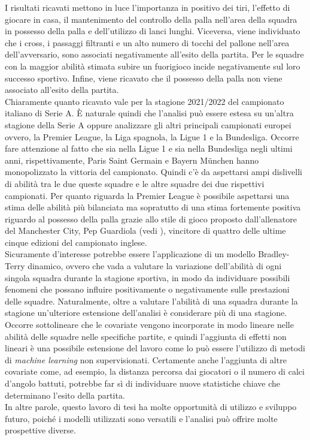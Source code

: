 I risultati ricavati mettono in luce l'importanza in positivo dei tiri, l'effetto di giocare in casa, il mantenimento del controllo della palla nell'area della squadra in possesso della palla e dell'utilizzo di lanci lunghi. Viceversa, viene individuato che i cross, i passaggi filtranti e un alto numero di tocchi del pallone nell'area dell’avversario, sono associati negativamente all'esito della partita. Per le squadre con la maggior abilità stimata subire un fuorigioco incide negativamente sul loro successo sportivo. Infine, viene ricavato che il possesso della palla non viene associato all'esito della partita.\\
Chiaramente quanto ricavato vale per la stagione 2021/2022 del campionato italiano di Serie A. È naturale quindi che l'analisi può essere estesa su un’altra stagione della Serie A oppure analizzare gli altri principali campionati europei ovvero, la Premier League, la Liga spagnola, la Ligue 1 e la Bundesliga. Occorre fare attenzione al fatto che sia nella Ligue 1 e sia nella Bundesliga negli ultimi anni, rispettivamente, Paris Saint Germain e Bayern München hanno monopolizzato la vittoria del campionato. Quindi c'è da aspettarsi ampi dislivelli di abilità tra le due queste squadre e le altre squadre dei due rispettivi campionati. Per quanto riguarda la Premier League è possibile aspettarsi una stima delle abilità più bilanciata ma sopratutto di una stima fortemente positiva riguardo al possesso della palla grazie allo stile di gioco proposto dall'allenatore del Manchester City, Pep Guardiola (vedi \textit{\cite{futbol}}), vincitore di quattro delle ultime cinque edizioni del campionato inglese.\\
Sicuramente d'interesse potrebbe essere l'applicazione di un modello Bradley-Terry dinamico, ovvero che vada a valutare la variazione dell'abilità di ogni singola squadra durante la stagione sportiva, in modo da individuare possibili fenomeni che possano influire positivamente o negativamente sulle prestazioni delle squadre. Naturalmente, oltre a valutare l'abilità di una squadra durante la stagione un'ulteriore estensione dell'analisi è considerare più di una stagione. Occorre sottolineare che le covariate vengono incorporate in modo lineare nelle abilità delle squadre nelle specifiche partite, e quindi l'aggiunta di effetti non lineari è una possibile estensione del lavoro come lo può essere l'utilizzo di metodi di \emph{machine learning} non supervisionati. Certamente anche l'aggiunta di altre covariate come, ad esempio, la distanza percorsa dai giocatori o il numero di calci d'angolo battuti, potrebbe far sì di individuare nuove statistiche chiave che determinano l'esito della partita.\\
In altre parole, questo lavoro di tesi ha molte opportunità di utilizzo e sviluppo futuro, poiché i modelli utilizzati sono versatili e l'analisi può offrire molte prospettive diverse.
